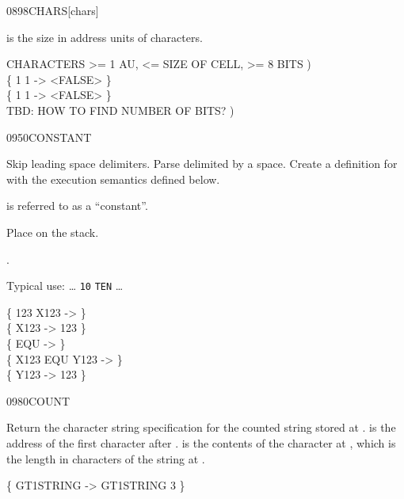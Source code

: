 \begin{worddef}{0898}{CHARS}[chars]
\item {}

	 is the size in address units of 
	characters.

	\begin{defer}
	\testing
		 CHARACTERS >= 1 AU, <= SIZE OF CELL, >= 8 BITS ) \\
		\{ 1  1  -> <FALSE> \} \\
		\{ 1  1   -> <FALSE> \} \\
		 TBD: HOW TO FIND NUMBER OF BITS? )
	\end{defer}
\end{worddef}


\begin{worddef}{0950}{CONSTANT}
\item {}

	Skip leading space delimiters. Parse  delimited by
	a space. Create a definition for  with the execution
	semantics defined below.

	 is referred to as a ``constant''.

\execute[name]
	\stack{}{x}

	Place  on the stack.

\see {}.

	\begin{defer}
	\rationale %
		Typical use: {\ldots}
			 \texttt{10}  \texttt{TEN}
			{\ldots}

	\testing
		\{ 123  X123 -> \} \\
		\{ X123 -> 123 \} \\
		\{ \word{:} EQU  \word{;} -> \} \\
		\{ X123 EQU Y123 -> \} \\
		\{ Y123 -> 123 \}
	\end{defer}
\end{worddef}


\begin{worddef}{0980}{COUNT}
\item {}

	Return the character string specification for the counted
	string stored at .  is the
	address of the first character after . \param{u}
	is the contents of the character at , which is
	the length in characters of the string at \param{c-addr_2}.

	\begin{defer}
	\testing
		\{ GT1STRING  -> GT1STRING  3 \}
	\end{defer}
\end{worddef}



